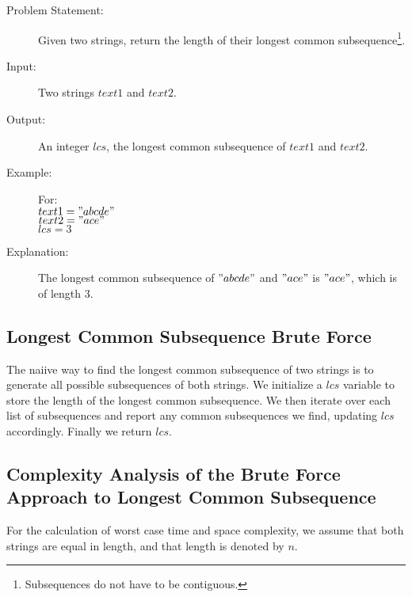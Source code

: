 \begin{description}
    \item[Problem Statement:]
        Given two strings, return the length of their longest common subsequence\footnote{Subsequences do not have to be contiguous.}.

    \item[Input:] 
        Two strings $text1$ and $text2$.
    \item[Output:] 
        An integer $lcs$, the longest common subsequence of $text1$ and $text2$.
        
    \item[Example:] For:\\
        $text1 = "abcde"$\\
        $text2 = "ace"$\\
        $lcs = 3$

    \item[Explanation:]
        The longest common subsequence of $"abcde"$ and $"ace"$ is $"ace"$, which is of length $3$.
   
\end{description}

\subsection{Longest Common Subsequence Brute Force}
The naiive way to find the longest common subsequence of two strings is to generate all possible subsequences of both strings.
We initialize a $lcs$ variable to store the length of the longest common subsequence.
We then iterate over each list of subsequences and report any common subsequences we find, updating $lcs$ accordingly.
Finally we return $lcs$.

\subsection{Complexity Analysis of the Brute Force Approach to Longest Common Subsequence}
For the calculation of worst case time and space complexity, we assume that both strings are equal in length, and that length is denoted by $n$.

